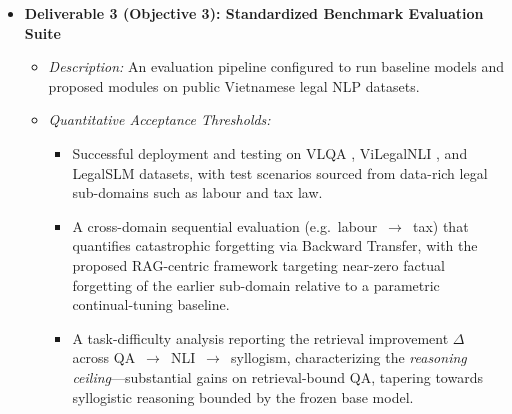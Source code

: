 \begin{itemize}[leftmargin=*]
\begin{itemize}
        \item \textit{Quantitative Acceptance Thresholds:}
        \begin{itemize}
            \item Forgetting curves (performance vs.\ ingestion volume) reported for all four arms on the three tasks.
            \item A measurable contrast: Backward Transfer near zero for the frozen-RAG framework while the parametric baseline degrades significantly (strongly negative BWT) at the highest ingestion level.
        \end{itemize}
    \end{itemize}

    \item \textbf{Deliverable 3 (Objective 3): Standardized Benchmark Evaluation Suite}
    \begin{itemize}
        \item \textit{Description:} An evaluation pipeline configured to run baseline models and proposed modules on public Vietnamese legal NLP datasets.
        \item \textit{Quantitative Acceptance Thresholds:}
        \begin{itemize}
            \item Successful deployment and testing on VLQA \parencite{nguyen2025vlqacomprehensivelargehighquality}, ViLegalNLI \parencite{duong2026vilegalnlinaturallanguageinference}, and LegalSLM \parencite{le-etal-2025-overview} datasets, with test scenarios sourced from data-rich legal sub-domains such as labour and tax law.
            \item A cross-domain sequential evaluation (e.g.\ labour~$\rightarrow$~tax) that quantifies catastrophic forgetting via Backward Transfer, with the proposed RAG-centric framework targeting near-zero factual forgetting of the earlier sub-domain relative to a parametric continual-tuning baseline.
            \item A task-difficulty analysis reporting the retrieval improvement $\Delta$ across QA~$\rightarrow$~NLI~$\rightarrow$~syllogism, characterizing the \emph{reasoning ceiling}---substantial gains on retrieval-bound QA, tapering towards syllogistic reasoning bounded by the frozen base model.
        \end{itemize}
    \end{itemize}
\end{itemize}

